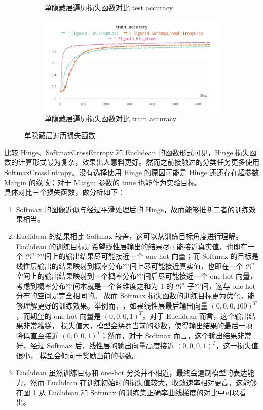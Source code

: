 \documentclass{article}
\begin{document}
\begin{figure}[htbp]
\begin{subfigure}{0.475\textwidth}
		\caption{单隐藏层遍历损失函数对比 test accuracy}
	\end{subfigure}
	\begin{subfigure}{0.475\textwidth}
		\centering
		\includegraphics[width=1\textwidth]{../pics/单层损失函数train_acc.png}
		\caption{单隐藏层遍历损失函数对比 train accuracy}
		\label{fig:4d}
	\end{subfigure}
	\caption{单隐藏层遍历损失函数}
	\label{fig:4}
\end{figure}

比较 Hinge、SoftmaxCrossEntropy 和 Euclidean 的函数形式可见，Hinge 损失函数的计算形式最为复杂，效果出人意料更好。然而之前接触过的分类任务更多使用 SoftmaxCrossEntropy。没有选择使用 Hinge 的原因可能是 Hinge 还还存在超参数 Margin 的缘故；对于 Margin 参数的 tune 也能作为实验目标。\\
具体对比三个损失函数，做分析如下：

\begin{enumerate}
 	\item Softmax 的图像近似与经过平滑处理后的 Hinge，故而能够推断二者的训练效果相当。
 	\item Euclidean 的结果相比 Softmax 较差，这可以从训练目标角度进行理解。Euclidean 的训练目标是希望线性层输出的结果尽可能接近真实值，也即在一个 $\Re^n$ 空间上的输出结果尽可能接近一个 one-hot 向量；而 Softmax
 	的目标是线性层输出的结果映射到概率分布空间上尽可能接近真实值，也即在一个 $\Re^n$ 空间上的输出结果映射到一个概率分布空间后尽可能接近一个 one-hot 向量，考虑到概率分布空间本就是一个各维度之和为 1 的 $\Re^n$ 子空间，这与 one-hot 分布的空间是完全相同的。
	故而 Softmax 损失函数的训练目标更为优化，能够理解更好的训练效果。举例而言，如果线性层最后输出向量 $(0, 0, 0, 100)^T$，而期望的 one-hot 向量是 $(0, 0, 0, 1)^T$。对于 Euclidean 而言，这个输出结果非常糟糕，
	损失值大，模型会惩罚当前的参数，使得输出结果的最后一项降低直至接近 $(0, 0, 0, 1)^T$；然而，对于 Softmax 而言，这个输出结果非常好，经过 Softmax 后，线性层的输出向量高度接近 $(0, 0, 0, 1)^T$，这一损失值很小，
	模型会倾向于奖励当前的参数。
	\item Euclidean 虽然训练目标和 one-hot 分类并不相近，最终会遏制模型的表达能力，然而 Euclidean 在训练初始时的损失值较大，收敛速率相对更高，这能够在图 \ref{fig:4d} 从 Euclidean 和 Softmax 的训练集正确率曲线梯度的对比中可以看出。
\end{enumerate}
\end{document}
